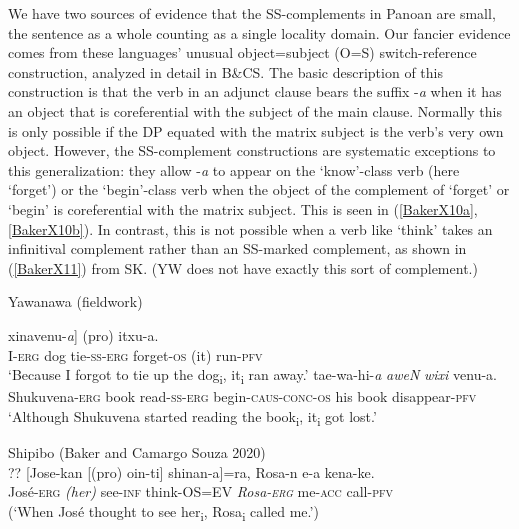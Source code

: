 \documentclass[output=paper]{langscibook}
\begin{document}
We have two sources of evidence that the SS-complements in Panoan are small, the sentence as a whole counting as a single locality domain. Our fancier evidence comes from these languages’ unusual object=subject (O=S) switch-ref\-er\-ence construction, analyzed in detail in B\&CS. The basic description of this construction is that the verb in an adjunct clause bears the suffix -\textit{a} when it has an object that is coreferential with the subject of the main clause. Normally this is only possible if the DP equated with the matrix subject is the verb’s very own object. However, the SS-complement constructions are systematic exceptions to this generalization: they allow -\textit{a} to appear on the ‘know’-class verb (here ‘forget’) or the ‘begin’-class verb when the object of the complement of ‘forget’ or ‘begin’ is coreferential with the matrix subject. This is seen in (\ref{BakerX10a}, \ref{BakerX10b}). In contrast, this is not possible when a verb like ‘think’ takes an infinitival complement rather than an SS-marked complement, as shown in (\ref{BakerX11}) from SK. (YW does not have exactly this sort of complement.)

\begin{exe}
\ex Yawanawa (fieldwork) \label{BakerX10}
    \begin{xlist}
    \ex \label{BakerX10a}
		\gll [E-N [\textit{kaNmaN} nesha-ki-N] xinavenu-\textit{a}] (pro) itxu-a.\\
		     I-\textsc{erg} dog tie-\textsc{ss-erg} forget-\textsc{os} (it) run-\textsc{pfv}\\
		    \glt `Because I forgot to tie up the dog\textsubscript{i}, it\textsubscript{i} ran away.'
	\ex \label{BakerX10b}
		\gll [Shukuvena-N [\textit{wixi} ane-ki-N] tae-wa-hi-\textit{a} \textit{aweN} \textit{wixi} venu-a.\\
			 Shukuvena-\textsc{erg} book read-\textsc{ss-erg} begin-\textsc{caus-conc-os} his book disappear-\textsc{pfv}\\
		    \glt `Although Shukuvena started reading the book\textsubscript{i}, it\textsubscript{i} got lost.'
    \end{xlist}

\ex Shipibo (Baker and Camargo Souza 2020) \label{BakerX11}\\
    \gll ?? [Jose-kan [(pro) oin-ti] shinan-a]=ra, Rosa-n e-a kena-ke.\\
        {} José-\textsc{erg} \textit{(her)} see-\textsc{inf} think-\textsc{OS=EV} \textit{Rosa-\textsc{erg}} me-\textsc{acc} call-\textsc{pfv}\\
    \glt \phantom{??} (`When José thought to see her\textsubscript{i}, Rosa\textsubscript{i} called me.')
\end{exe}
\end{document}
